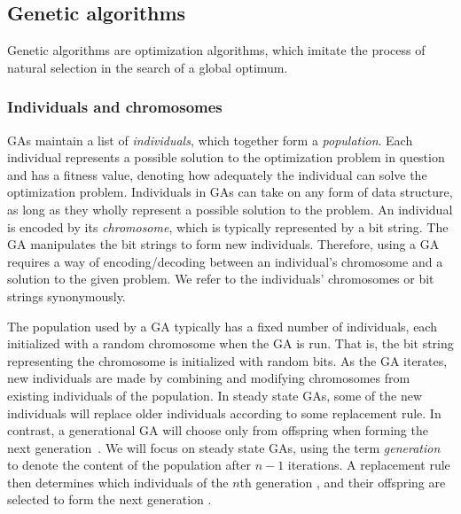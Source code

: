 \subsection{Genetic algorithms} 
Genetic algorithms are optimization algorithms, which imitate the process of natural selection in the search of a global optimum.

\subsubsection{Individuals and chromosomes}
GAs maintain a list of \emph{individuals}, which together form a \emph{population}. Each individual represents a possible solution to the optimization problem in question and has a fitness value, denoting how adequately the individual can solve the optimization problem. Individuals in GAs can take on any form of data structure, as long as they wholly represent a possible solution to the problem. An individual is encoded by its \emph{chromosome}, which is typically represented by a bit string. The GA manipulates the bit strings to form new individuals. Therefore, using a GA requires a way of encoding/decoding between an individual's chromosome and a solution to the given problem. We refer to the individuals' chromosomes or bit strings synonymously.

The population used by a GA typically has a fixed number of individuals, each initialized with a random chromosome when the GA is run. That is, the bit string representing the chromosome is initialized with random bits. As the GA iterates, new individuals are made by combining and modifying chromosomes from existing individuals of the population. In steady state GAs, some of the new individuals will replace older individuals according to some replacement rule. In contrast, a generational GA will choose only from offspring when forming the next generation~\cite{fogarty, Syswerda:1989:UCG:645512.657265, Whitley:1989:GAS:93126.93169}. We will focus on steady state GAs, using the term \emph{generation}  to denote the content of the population after $n - 1$ iterations. A replacement rule then determines which individuals of the $n$th generation , and their offspring  are selected to form the next generation .



